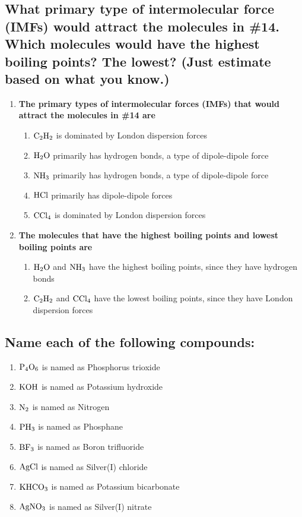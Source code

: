 \documentclass[11pt]{article}
\begin{document}
\subsection{What primary type of intermolecular force (IMFs) would attract the molecules in \#14. Which molecules would have the highest boiling points? The lowest? (Just estimate based on what you know.)}
\label{sec:org16fcd1e}
\begin{enumerate}
\item \textbf{The primary types of intermolecular forces (IMFs) that would attract the molecules in \#14 are}
\begin{enumerate}
\item \(\ce{C2H2}\) is dominated by London dispersion forces
\item \(\ce{H2O}\) primarily has hydrogen bonds, a type of dipole-dipole force
\item \(\ce{NH3}\) primarily has hydrogen bonds, a type of dipole-dipole force
\item \(\ce{HCl}\) primarily has dipole-dipole forces
\item \(\ce{CCl4}\) is dominated by London dispersion forces
\end{enumerate}
\item \textbf{The molecules that have the highest boiling points and lowest boiling points are}
\begin{enumerate}
\item \(\ce{H2O}\) and \(\ce{NH3}\)  have the highest boiling points, since they have hydrogen bonds
\item \(\ce{C2H2}\) and \(\ce{CCl4}\) have the lowest boiling points, since they have London dispersion forces
\end{enumerate}
\end{enumerate}


\subsection{Name each of the following compounds:}
\label{sec:org2e2bb06}
\begin{enumerate}
\item \(\ce{P4O6}\) is named as Phosphorus trioxide
\item \(\ce{KOH}\) is named as Potassium hydroxide
\item \(\ce{N2}\) is named as Nitrogen
\item \(\ce{PH3}\) is named as Phosphane
\item \(\ce{BF3}\) is named as Boron trifluoride
\item \(\ce{AgCl}\) is named as Silver(I) chloride
\item \(\ce{KHCO3}\) is named as Potassium bicarbonate
\item \(\ce{AgNO3}\) is named as Silver(I) nitrate
\end{enumerate}
\end{document}
